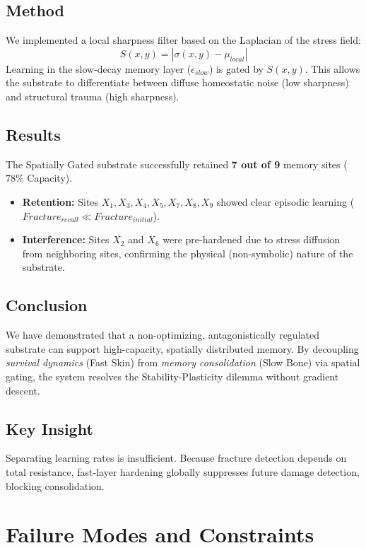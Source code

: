 \documentclass[11pt, a4paper]{article}
\begin{document}
\subsection{Method}
We implemented a local sharpness filter based on the Laplacian of the stress field:
\[ S(x,y) = | \sigma(x,y) - \mu_{local} | \]
Learning in the slow-decay memory layer ($\epsilon_{slow}$) is gated by $S(x,y)$. This allows the substrate to differentiate between diffuse homeostatic noise (low sharpness) and structural trauma (high sharpness).

\subsection{Results}
The Spatially Gated substrate successfully retained \textbf{7 out of 9} memory sites ($78\%$ Capacity).
\begin{itemize}
    \item \textbf{Retention:} Sites $X_1, X_3, X_4, X_5, X_7, X_8, X_9$ showed clear episodic learning ($Fracture_{recall} \ll Fracture_{initial}$).
    \item \textbf{Interference:} Sites $X_2$ and $X_6$ were pre-hardened due to stress diffusion from neighboring sites, confirming the physical (non-symbolic) nature of the substrate.
\end{itemize}

\subsection{Conclusion}
We have demonstrated that a non-optimizing, antagonistically regulated substrate can support high-capacity, spatially distributed memory. By decoupling \textit{survival dynamics} (Fast Skin) from \textit{memory consolidation} (Slow Bone) via spatial gating, the system resolves the Stability-Plasticity dilemma without gradient descent.

\subsection{Key Insight}
Separating learning rates is insufficient. Because fracture detection depends on total resistance, fast-layer hardening globally suppresses future damage detection, blocking consolidation.

\section{Failure Modes and Constraints}
\end{document}
